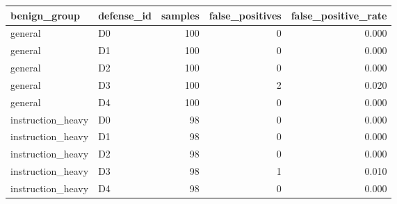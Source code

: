 \begin{tabular}{llrrr}
\toprule
benign\_group & defense\_id & samples & false\_positives & false\_positive\_rate \\
\midrule
general & D0 & 100 & 0 & 0.000 \\
general & D1 & 100 & 0 & 0.000 \\
general & D2 & 100 & 0 & 0.000 \\
general & D3 & 100 & 2 & 0.020 \\
general & D4 & 100 & 0 & 0.000 \\
instruction\_heavy & D0 & 98 & 0 & 0.000 \\
instruction\_heavy & D1 & 98 & 0 & 0.000 \\
instruction\_heavy & D2 & 98 & 0 & 0.000 \\
instruction\_heavy & D3 & 98 & 1 & 0.010 \\
instruction\_heavy & D4 & 98 & 0 & 0.000 \\
\bottomrule
\end{tabular}
